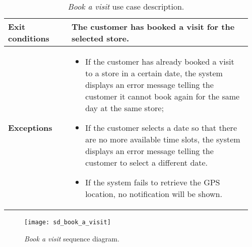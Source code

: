 \begin{table}[H]
\begin{tabular}{@{}p{0.25\linewidth}p{0.71\linewidth}@{}}
        \midrule
        \textbf{Exit conditions} & The customer has booked a visit for the selected store. \\
        \midrule
        \textbf{Exceptions} &
        \begin{itemize}[leftmargin=.4cm,noitemsep,topsep=0pt,before=\vspace{-3mm},after=\vspace{-4mm}]
            \item If the customer has already booked a visit to a store in a certain date, the system displays an error message telling the customer it cannot book again for the same day at the same store;
            \item If the customer selects a date so that there are no more available time slots, the system displays an error message telling the customer to select a different date.
            \item If the system fails to retrieve the GPS location, no notification will be shown.
        \end{itemize} \\

        \bottomrule
    \end{tabular}
    \caption{\textit{Book a visit} use case description.}
\end{table}

\begin{figure}[H]
    \centering
    \texttt{[image: sd\_book\_a\_visit]}
    \caption{\textit{Book a visit} sequence diagram.}
\end{figure}


